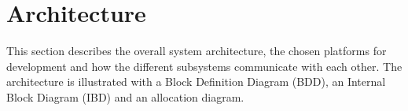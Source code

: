 
\chapter{Architecture}
\label{sec:Architecture}
This section describes the overall system architecture, the chosen platforms for development and how the different subsystems communicate with each other.
The architecture is illustrated with a Block Definition Diagram (BDD), an Internal Block Diagram (IBD) and an allocation diagram.

\FloatBarrier